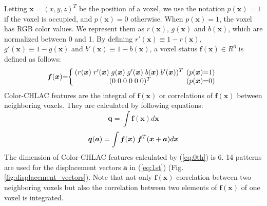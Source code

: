 \documentclass[conference]{sty/IEEEtran}
\begin{document}
Letting $\bm{x}=(x,y,z)^T$ be the position of a voxel, 
    we use the notation $p(\bm{x})=1$ if the voxel is occupied, and $p(\bm{x})=0$ otherwise. 
When $p(\bm{x})=1$, the voxel has RGB color values.
We represent them as $r(\bm{x})$, $g(\bm{x})$ and $b(\bm{x})$, 
    which are normalized between 0 and 1.
By defining $r'(\bm{x}) \equiv 1 - r(\bm{x})$, $g'(\bm{x}) \equiv 1 - g(\bm{x})$ and $b'(\bm{x}) \equiv 1 - b(\bm{x})$, 
    a voxel status $\bm{f}(\bm{x})\in R^6$ is defined as follows:
\begin{eqnarray*}
  \label{eq:voxel}
  \bm{f}({\bm x})\hspace{-1mm}=\hspace{-1mm}\left\{
  \begin{array}{cc}
    \hspace{-1mm}
    (r({\bm x})\hspace{1mm} r'({\bm x}) \hspace{1mm}g({\bm x}) \hspace{1mm}g'({\bm x}) \hspace{1mm}b({\bm x}) \hspace{1mm}b'({\bm x}))^T & \hspace{-2mm}(p({\bm x})\hspace{-1mm}=\hspace{-1mm}1) \\
    (0\hspace{1mm}0\hspace{1mm}0\hspace{1mm}0\hspace{1mm}0\hspace{1mm}0)^T & \hspace{-2mm}(p({\bm x})\hspace{-1mm}=\hspace{-1mm}0)
  \end{array}\right.
\end{eqnarray*}
%
Color-CHLAC features are the integral of $\bm{f}(\bm{x})$ or correlations of $\bm{f}(\bm{x})$ between neighboring voxels.
They are calculated by following equations:  
\begin{equation}\label{eq:0th}
  {\bm q} = \int \bm{f}({\bm x}) d{\bm x} 
\end{equation}
\begin{equation}\label{eq:1st}
  {\bm q}({\bm a}) = \int \bm{f}({\bm x}) \hspace{1mm}\bm{f}^T({\bm x}+{\bm a}) d{\bm x} \\
\end{equation}
%
The dimension of Color-CHLAC features calculated by (\ref{eq:0th}) is 6. 
14 patterns are used for the displacement vectors ${\bm a}$ in (\ref{eq:1st}) (Fig. \ref{fig:displacement_vectors}). 
Note that not only $\bm{f}(\bm{x})$ correlation between two neighboring voxels 
    but also the correlation between two elements of $\bm{f}(\bm{x})$ of one voxel is integrated. 
\end{document}
